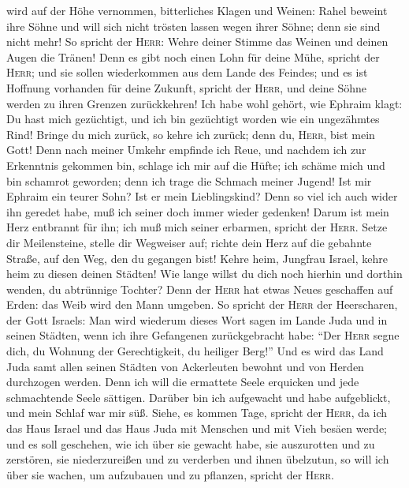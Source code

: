 wird auf der Höhe vernommen, bitterliches Klagen und Weinen: Rahel
beweint ihre Söhne und will sich nicht trösten lassen wegen ihrer Söhne;
denn sie sind nicht mehr!  So spricht der \textsc{Herr}:
Wehre deiner Stimme das Weinen und deinen Augen die Tränen! Denn es gibt
noch einen Lohn für deine Mühe, spricht der \textsc{Herr}; und sie
sollen wiederkommen aus dem Lande des Feindes;  und es
ist Hoffnung vorhanden für deine Zukunft, spricht der \textsc{Herr}, und
deine Söhne werden zu ihren Grenzen zurückkehren!  Ich
habe wohl gehört, wie Ephraim klagt: Du hast mich gezüchtigt, und ich
bin gezüchtigt worden wie ein ungezähmtes Rind! Bringe du mich zurück,
so kehre ich zurück; denn du, \textsc{Herr}, bist mein Gott!
 Denn nach meiner Umkehr empfinde ich Reue, und nachdem
ich zur Erkenntnis gekommen bin, schlage ich mir auf die Hüfte; ich
schäme mich und bin schamrot geworden; denn ich trage die Schmach meiner
Jugend!  Ist mir Ephraim ein teurer Sohn? Ist er mein
Lieblingskind? Denn so viel ich auch wider ihn geredet habe, muß ich
seiner doch immer wieder gedenken! Darum ist mein Herz entbrannt für
ihn; ich muß mich seiner erbarmen, spricht der \textsc{Herr}.
 Setze dir Meilensteine, stelle dir Wegweiser auf; richte
dein Herz auf die gebahnte Straße, auf den Weg, den du gegangen bist!
Kehre heim, Jungfrau Israel, kehre heim zu diesen deinen Städten!
 Wie lange willst du dich noch hierhin und dorthin
wenden, du abtrünnige Tochter? Denn der \textsc{Herr} hat etwas Neues
geschaffen auf Erden: das Weib wird den Mann umgeben.  So
spricht der \textsc{Herr} der Heerscharen, der Gott Israels: Man wird
wiederum dieses Wort sagen im Lande Juda und in seinen Städten, wenn ich
ihre Gefangenen zurückgebracht habe: ``Der \textsc{Herr} segne dich, du
Wohnung der Gerechtigkeit, du heiliger Berg!''  Und es
wird das Land Juda samt allen seinen Städten von Ackerleuten bewohnt und
von Herden durchzogen werden.  Denn ich will die
ermattete Seele erquicken und jede schmachtende Seele sättigen.
 Darüber bin ich aufgewacht und habe aufgeblickt, und
mein Schlaf war mir süß.  Siehe, es kommen Tage, spricht
der \textsc{Herr}, da ich das Haus Israel und das Haus Juda mit Menschen
und mit Vieh besäen werde;  und es soll geschehen, wie
ich über sie gewacht habe, sie auszurotten und zu zerstören, sie
niederzureißen und zu verderben und ihnen übelzutun, so will ich über
sie wachen, um aufzubauen und zu pflanzen, spricht der \textsc{Herr}.

